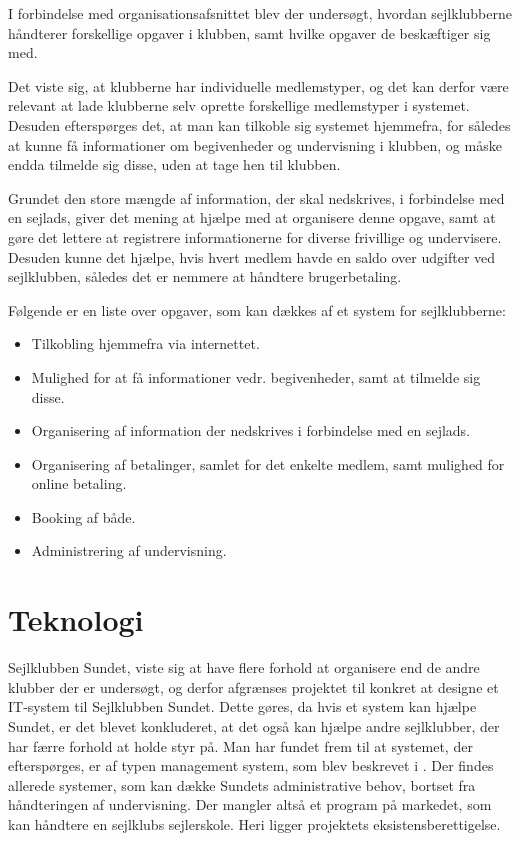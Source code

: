 I forbindelse med organisationsafsnittet blev der undersøgt, hvordan sejlklubberne håndterer forskellige opgaver i klubben, samt hvilke opgaver de beskæftiger sig med.

Det viste sig, at klubberne har individuelle medlemstyper, og det kan derfor være relevant at lade klubberne selv oprette forskellige medlemstyper i systemet. 
Desuden efterspørges det, at man kan tilkoble sig systemet hjemmefra, for således at kunne få informationer om begivenheder og undervisning i klubben, og måske endda tilmelde sig disse, uden at tage hen til klubben.

Grundet den store mængde af information, der skal nedskrives, i forbindelse med en sejlads, giver det mening at hjælpe med at organisere denne opgave, samt at gøre det lettere at registrere informationerne for diverse frivillige og undervisere. 
Desuden kunne det hjælpe, hvis hvert medlem havde en saldo over udgifter ved sejlklubben, således det er nemmere at håndtere brugerbetaling.

Følgende er en liste over opgaver, som kan dækkes af et system for sejlklubberne:

\begin{itemize}
  \item Tilkobling hjemmefra via internettet.
  \item Mulighed for at få informationer vedr. begivenheder, samt at tilmelde sig disse.
  \item Organisering af information der nedskrives i forbindelse med en sejlads.
  \item Organisering af betalinger, samlet for det enkelte medlem, samt mulighed for online betaling.
  \item Booking af både.
  \item Administrering af undervisning.
\end{itemize}


\section{Teknologi}

Sejlklubben Sundet, viste sig at have flere forhold at organisere end de andre klubber der er undersøgt, og derfor afgrænses projektet til konkret at designe et IT-system til Sejlklubben Sundet. 
Dette gøres, da hvis et system kan hjælpe Sundet, er det blevet konkluderet, at det også kan hjælpe andre sejlklubber, der har færre forhold at holde styr på.
Man har fundet frem til at systemet, der efterspørges, er af typen management system, som blev beskrevet i .
Der findes allerede systemer, som kan dække Sundets administrative behov, bortset fra håndteringen af undervisning.
Der mangler altså et program på markedet, som kan håndtere en sejlklubs sejlerskole.
Heri ligger projektets eksistensberettigelse.

